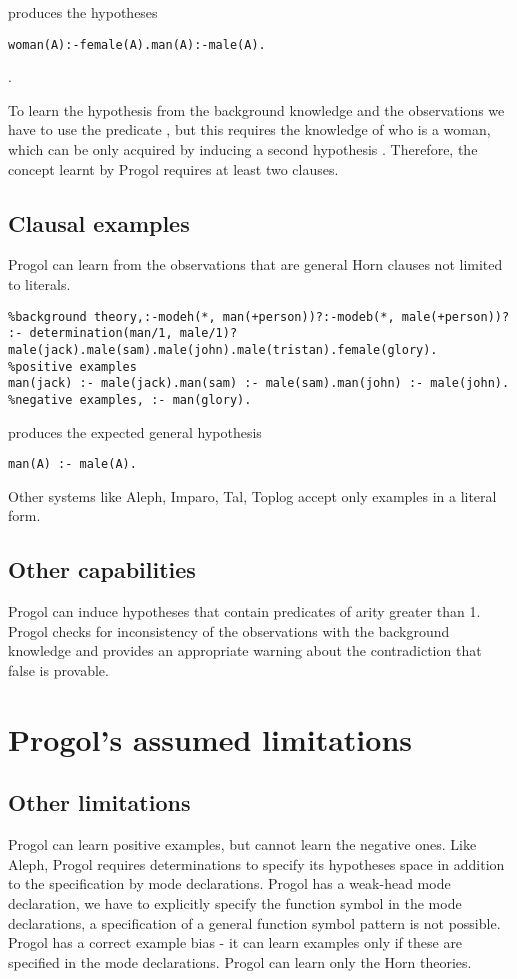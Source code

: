 produces the hypotheses
\begin{lstlisting}
woman(A):-female(A).man(A):-male(A).
\end{lstlisting}.

To learn the hypothesis  from the background knowledge and the observations we have to use the predicate , but this requires the knowledge of who is a woman, which can be only acquired by inducing a second hypothesis . Therefore, the concept learnt by Progol requires at least two clauses.

\subsection{Clausal examples}
Progol can learn from the observations that are general Horn clauses not limited to literals.
\begin{lstlisting}
%background theory,:-modeh(*, man(+person))?:-modeb(*, male(+person))?
:- determination(man/1, male/1)?
male(jack).male(sam).male(john).male(tristan).female(glory).
%positive examples
man(jack) :- male(jack).man(sam) :- male(sam).man(john) :- male(john).
%negative examples, :- man(glory).
\end{lstlisting}
produces the expected general hypothesis
\begin{lstlisting}
man(A) :- male(A).
\end{lstlisting}

Other systems like Aleph, Imparo, Tal, Toplog accept only examples in a literal form.

\subsection{Other capabilities}
Progol can induce hypotheses that contain predicates of arity greater than 1. Progol checks for inconsistency of the observations with the background knowledge and provides an appropriate warning about the contradiction that false is provable.

\section{Progol's assumed limitations}

\subsection{Other limitations}
Progol can learn positive examples, but cannot learn the negative ones. Like Aleph, Progol requires determinations to specify its hypotheses space in addition to the specification by mode declarations. Progol has a weak-head mode declaration, we have to explicitly specify the function symbol in the mode declarations, a specification of a general function symbol pattern is not possible. Progol has a correct example bias - it can learn examples only if these are specified in the mode declarations. Progol can learn only the Horn theories.

